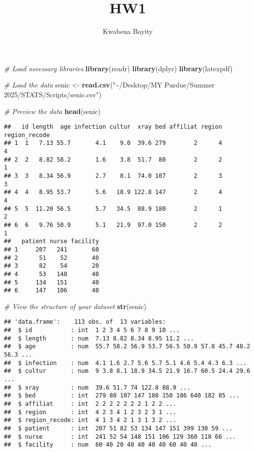 \documentclass[
]{article}
\title{HW1}
\author{Kwabena Bayity}
\date{}
\newenvironment{Shaded}{\begin{snugshade}}{\end{snugshade}}
\newcommand{\CommentTok}[1]{\textcolor[rgb]{0.56,0.35,0.01}{\textit{#1}}}
\newcommand{\FunctionTok}[1]{\textcolor[rgb]{0.13,0.29,0.53}{\textbf{#1}}}
\newcommand{\NormalTok}[1]{#1}
\newcommand{\OtherTok}[1]{\textcolor[rgb]{0.56,0.35,0.01}{#1}}
\newcommand{\StringTok}[1]{\textcolor[rgb]{0.31,0.60,0.02}{#1}}
\begin{document}
\maketitle

\begin{Shaded}
\begin{Highlighting}[]
\CommentTok{\# Load necessary libraries}
\FunctionTok{library}\NormalTok{(readr)}
\FunctionTok{library}\NormalTok{(dplyr)}
\FunctionTok{library}\NormalTok{(latexpdf)}

\CommentTok{\# Load the data}
\NormalTok{senic }\OtherTok{\textless{}{-}} \FunctionTok{read.csv}\NormalTok{(}\StringTok{"\textasciitilde{}/Desktop/MY Purdue/Summer 2025/STATS/Scripts/senic.csv"}\NormalTok{)}

\CommentTok{\# Preview the data}
\FunctionTok{head}\NormalTok{(senic)}
\end{Highlighting}
\end{Shaded}

\begin{verbatim}
##   id length  age infection cultur  xray bed affiliat region region_recode
## 1  1   7.13 55.7       4.1    9.0  39.6 279        2      4             4
## 2  2   8.82 58.2       1.6    3.8  51.7  80        2      2             1
## 3  3   8.34 56.9       2.7    8.1  74.0 107        2      3             3
## 4  4   8.95 53.7       5.6   18.9 122.8 147        2      4             4
## 5  5  11.20 56.5       5.7   34.5  88.9 180        2      1             2
## 6  6   9.76 50.9       5.1   21.9  97.0 150        2      2             1
##   patient nurse facility
## 1     207   241       60
## 2      51    52       40
## 3      82    54       20
## 4      53   148       40
## 5     134   151       40
## 6     147   106       40
\end{verbatim}

\begin{Shaded}
\begin{Highlighting}[]
\CommentTok{\# View the structure of your dataset}
\FunctionTok{str}\NormalTok{(senic)}
\end{Highlighting}
\end{Shaded}

\begin{verbatim}
## 'data.frame':    113 obs. of  13 variables:
##  $ id           : int  1 2 3 4 5 6 7 8 9 10 ...
##  $ length       : num  7.13 8.82 8.34 8.95 11.2 ...
##  $ age          : num  55.7 58.2 56.9 53.7 56.5 50.9 57.8 45.7 48.2 56.3 ...
##  $ infection    : num  4.1 1.6 2.7 5.6 5.7 5.1 4.6 5.4 4.3 6.3 ...
##  $ cultur       : num  9 3.8 8.1 18.9 34.5 21.9 16.7 60.5 24.4 29.6 ...
##  $ xray         : num  39.6 51.7 74 122.8 88.9 ...
##  $ bed          : int  279 80 107 147 180 150 186 640 182 85 ...
##  $ affiliat     : int  2 2 2 2 2 2 2 1 2 2 ...
##  $ region       : int  4 2 3 4 1 2 3 2 3 1 ...
##  $ region_recode: int  4 1 3 4 2 1 3 1 3 2 ...
##  $ patient      : int  207 51 82 53 134 147 151 399 130 59 ...
##  $ nurse        : int  241 52 54 148 151 106 129 360 118 66 ...
##  $ facility     : num  60 40 20 40 40 40 40 60 40 40 ...
\end{verbatim}
\end{document}
